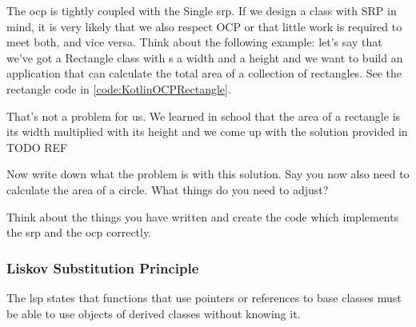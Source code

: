 The \gls{ocp} is tightly coupled with the Single \gls{srp}.
If we design a class with SRP in mind, it is very likely that we also respect OCP or that little work is required to meet both, and vice versa.
Think about the following example: let’s say that we’ve got a Rectangle class with s a width and a height and we want to build an application that can calculate the total area of a collection of rectangles.
See the rectangle code in \ref{code:KotlinOCPRectangle}.



That’s not a problem for us.
We learned in school that the area of a rectangle is its width multiplied with its height and we come up with the solution provided in TODO REF




Now write down what the problem is with this solution.
Say you now also need to calculate the area of a circle.
What things do you need to adjust? 

\begin{exercise}
	Think about the things you have written and create the code which implements the \gls{srp} and the  \gls{ocp} correctly. 
\end{exercise}

\subsubsection{Liskov Substitution Principle}


\begin{framed}
	The \gls{lsp} states that functions that use pointers or references to base classes must be able to use objects of derived classes without knowing it.
\end{framed}

